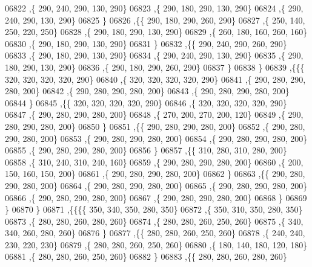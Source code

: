 \begin{DoxyCode}
06822     ,\{   290,   240,   290,   130,   290\}
06823     ,\{   290,   180,   290,   130,   290\}
06824     ,\{   290,   240,   290,   130,   290\}
06825     \}
06826    ,\{\{   290,   180,   290,   260,   290\}
06827     ,\{   250,   140,   250,   220,   250\}
06828     ,\{   290,   180,   290,   130,   290\}
06829     ,\{   260,   180,   160,   260,   160\}
06830     ,\{   290,   180,   290,   130,   290\}
06831     \}
06832    ,\{\{   290,   240,   290,   260,   290\}
06833     ,\{   290,   180,   290,   130,   290\}
06834     ,\{   290,   240,   290,   130,   290\}
06835     ,\{   290,   180,   290,   130,   290\}
06836     ,\{   290,   180,   290,   260,   290\}
06837     \}
06838    \}
06839   ,\{\{\{   320,   320,   320,   320,   290\}
06840     ,\{   320,   320,   320,   320,   290\}
06841     ,\{   290,   280,   290,   280,   200\}
06842     ,\{   290,   280,   290,   280,   200\}
06843     ,\{   290,   280,   290,   280,   200\}
06844     \}
06845    ,\{\{   320,   320,   320,   320,   290\}
06846     ,\{   320,   320,   320,   320,   290\}
06847     ,\{   290,   280,   290,   280,   200\}
06848     ,\{   270,   200,   270,   200,   120\}
06849     ,\{   290,   280,   290,   280,   200\}
06850     \}
06851    ,\{\{   290,   280,   290,   280,   200\}
06852     ,\{   290,   280,   290,   280,   200\}
06853     ,\{   290,   280,   290,   280,   200\}
06854     ,\{   290,   280,   290,   280,   200\}
06855     ,\{   290,   280,   290,   280,   200\}
06856     \}
06857    ,\{\{   310,   280,   310,   280,   200\}
06858     ,\{   310,   240,   310,   240,   160\}
06859     ,\{   290,   280,   290,   280,   200\}
06860     ,\{   200,   150,   160,   150,   200\}
06861     ,\{   290,   280,   290,   280,   200\}
06862     \}
06863    ,\{\{   290,   280,   290,   280,   200\}
06864     ,\{   290,   280,   290,   280,   200\}
06865     ,\{   290,   280,   290,   280,   200\}
06866     ,\{   290,   280,   290,   280,   200\}
06867     ,\{   290,   280,   290,   280,   200\}
06868     \}
06869    \}
06870   \}
06871  ,\{\{\{\{   350,   340,   350,   280,   350\}
06872     ,\{   350,   310,   350,   280,   350\}
06873     ,\{   280,   280,   260,   280,   260\}
06874     ,\{   280,   280,   260,   250,   260\}
06875     ,\{   340,   340,   260,   280,   260\}
06876     \}
06877    ,\{\{   280,   280,   260,   250,   260\}
06878     ,\{   240,   240,   230,   220,   230\}
06879     ,\{   280,   280,   260,   250,   260\}
06880     ,\{   180,   140,   180,   120,   180\}
06881     ,\{   280,   280,   260,   250,   260\}
06882     \}
06883    ,\{\{   280,   280,   260,   280,   260\}

\end{DoxyCode}
